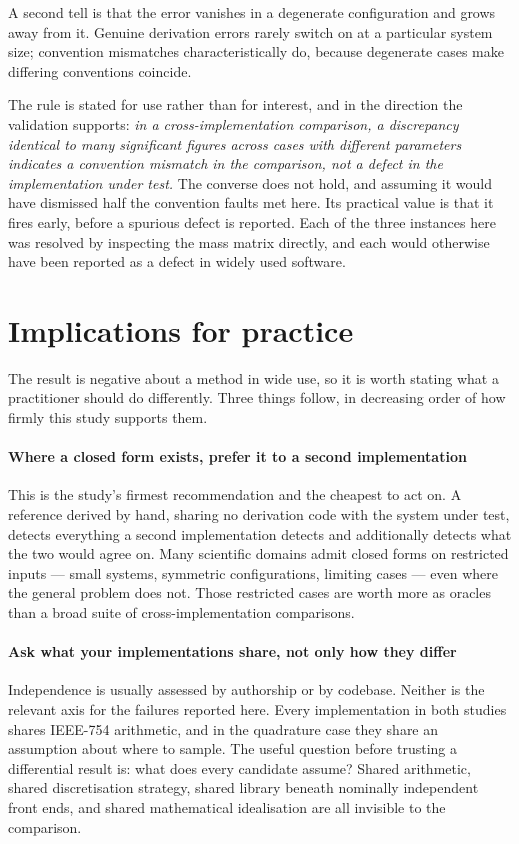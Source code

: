 \documentclass[review,12pt]{elsarticle}
\begin{document}
A second tell is that the error vanishes in a degenerate configuration and grows
away from it. Genuine derivation errors rarely switch on at a particular system
size; convention mismatches characteristically do, because degenerate cases make
differing conventions coincide.

The rule is stated for use rather than for interest, and in the direction the
validation supports: \emph{in a cross-implementation comparison, a discrepancy
identical to many significant figures across cases with different parameters
indicates a convention mismatch in the comparison, not a defect in the
implementation under test.} The converse does not hold, and assuming it would
have dismissed half the convention faults met here. Its practical value is that
it fires early, before a spurious defect is reported. Each of the
three instances here was resolved by inspecting the mass matrix directly, and
each would otherwise have been reported as a defect in widely used software.

\section{Implications for practice}\label{sec:practice}

The result is negative about a method in wide use, so it is worth stating what
a practitioner should do differently. Three things follow, in decreasing order
of how firmly this study supports them.

\paragraph{Where a closed form exists, prefer it to a second implementation}
This is the study's firmest recommendation and the cheapest to act on. A
reference derived by hand, sharing no derivation code with the system under
test, detects everything a second implementation detects and additionally
detects what the two would agree on. Many scientific domains admit closed forms
on restricted inputs --- small systems, symmetric configurations, limiting cases
--- even where the general problem does not. Those restricted cases are worth
more as oracles than a broad suite of cross-implementation comparisons.

\paragraph{Ask what your implementations share, not only how they differ}
Independence is usually assessed by authorship or by codebase. Neither is the
relevant axis for the failures reported here. Every implementation in both
studies shares IEEE-754 arithmetic, and in the quadrature case they share an
assumption about where to sample. The useful question before trusting a
differential result is: what does every candidate assume? Shared arithmetic,
shared discretisation strategy, shared library beneath nominally independent
front ends, and shared mathematical idealisation are all invisible to the
comparison.
\end{document}
